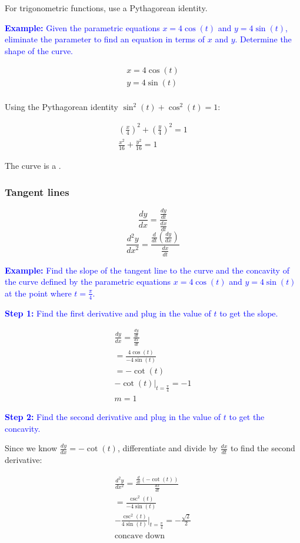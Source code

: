 \documentclass[letterpaper, 12pt]{article}
\newcommand{\example}[1]{\textcolor{blue}{\textbf{Example:} #1}}
\newcommand{\step}[2]{\textcolor{blue}{\textbf{Step #1:} #2}}
\begin{document}
For trigonometric functions, use a Pythagorean identity.

\example{Given the parametric equations $x = 4\cos(t)$ and $y = 4\sin(t)$, eliminate the parameter to find an equation in terms of $x$ and $y$. Determine the shape of the curve.}

\begin{gather*}
x = 4\cos(t) \\
y = 4\sin(t) \\
\end{gather*}

Using the Pythagorean identity $\sin^2(t) + \cos^2(t) = 1$:

\begin{gather*}
\left(\frac{x}{4}\right)^2 + \left(\frac{y}{4}\right)^2 = 1 \\
\boxed{\frac{x^2}{16} + \frac{y^2}{16} = 1}
\end{gather*}

The curve is a .

\subsubsection*{Tangent lines}

$$\frac{dy}{dx} = \frac{\frac{dy}{dt}}{\frac{dx}{dt}}$$
$$\frac{d^2y}{dx^2} = \frac{\frac{d}{dt}\left(\frac{dy}{dx}\right)}{\frac{dx}{dt}}$$

\example{Find the slope of the tangent line to the curve and the concavity of the curve defined by the parametric equations $x = 4\cos(t)$ and $y = 4\sin(t)$ at the point where $t = \frac{\pi}{4}$.}

\step{1}{Find the first derivative and plug in the value of $t$ to get the slope.}

\begin{gather*}
\frac{dy}{dx} = \frac{\frac{dy}{dt}}{\frac{dx}{dt}} \\
= \frac{4\cos(t)}{-4\sin(t)} \\
= -\cot(t) \\
-\cot(t)|_{t = \frac{\pi}{4}} = -1 \\
\boxed{m = 1}
\end{gather*}

\step{2}{Find the second derivative and plug in the value of $t$ to get the concavity.}

Since we know $\frac{dy}{dx} = -\cot(t)$, differentiate and divide by $\frac{dx}{dt}$ to find the second derivative:

\begin{gather*}
\frac{d^2y}{dx^2} = \frac{\frac{d}{dt}\left(-\cot(t)\right)}{\frac{dx}{dt}} \\
= \frac{\csc^2(t)}{-4\sin(t)} \\
-\frac{\csc^2(t)}{4\sin(t)}|_{t = \frac{\pi}{4}} = -\frac{\sqrt{2}}{2} \\
\boxed{\text{concave down}}
\end{gather*}
\end{document}
